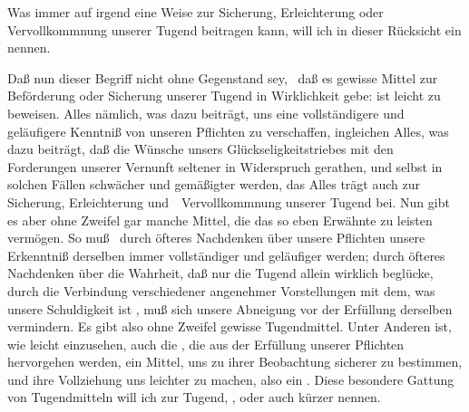 Was immer auf irgend eine Weise zur Sicherung, Erleichterung oder Vervollkommnung unserer Tugend beitragen kann, will ich in dieser Rücksicht ein  nennen.\par
Daß nun dieser Begriff nicht ohne Gegenstand sey, \dh\ daß es gewisse Mittel zur Beförderung oder Sicherung unserer Tugend in Wirklichkeit gebe: ist leicht zu beweisen. Alles nämlich, was dazu beiträgt, uns eine vollständigere und geläufigere Kenntniß von unseren Pflichten zu verschaffen, ingleichen Alles, was dazu beiträgt, daß die Wünsche unsers Glückseligkeitstriebes mit den Forderungen unserer Vernunft seltener in Widerspruch gerathen, und selbst in solchen Fällen schwächer und gemäßigter werden, das Alles trägt auch zur Sicherung, Erleichterung und~\ Vervollkommnung unserer Tugend bei. Nun gibt es aber ohne Zweifel gar manche Mittel, die das so eben Erwähnte zu leisten vermögen. So muß \zB\ durch öfteres Nachdenken über unsere Pflichten unsere Erkenntniß derselben immer vollständiger und geläufiger werden; durch öfteres Nachdenken über die Wahrheit, daß nur die Tugend allein wirklich beglücke, durch die Verbindung verschiedener angenehmer Vorstellungen mit dem, was unsere Schuldigkeit ist \udgl , muß sich unsere Abneigung vor der Erfüllung derselben vermindern. Es gibt also ohne Zweifel gewisse Tugendmittel. Unter Anderen ist, wie leicht einzusehen, auch die , die aus der Erfüllung unserer Pflichten  hervorgehen werden, ein Mittel, uns zu ihrer Beobachtung sicherer zu bestimmen, und ihre Vollziehung uns leichter zu machen, also ein . Diese besondere Gattung von Tugendmitteln will ich  zur Tugend, , oder auch kürzer  nennen.

